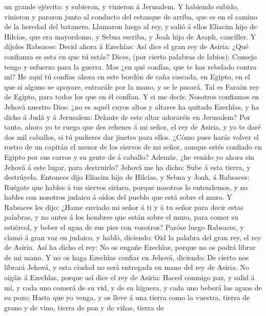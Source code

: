 un grande ejército: y subieron, y vinieron á Jerusalem. Y habiendo
subido, vinieron y pararon junto al conducto del estanque de arriba, que
es en el camino de la heredad del batanero.  Llamaron luego
al rey, y salió á ellos Eliacim hijo de Hilcías, que era mayordomo, y
Sebna escriba, y Joah hijo de Asaph, canciller.  Y díjoles
Rabsaces: Decid ahora á Ezechîas: Así dice el gran rey de Asiria: ¿Qué
confianza es esta en que tú estás?  Dices, (por cierto
palabras de labios): Consejo tengo y esfuerzo para la guerra. Mas ¿en
qué confías, que te has rebelado contra mí?  He aquí tú
confías ahora en este bordón de caña cascada, en Egipto, en el que si
alguno se apoyare, entrarále por la mano, y se le pasará. Tal es Faraón
rey de Egipto, para todos los que en él confían.  Y si me
decís: Nosotros confiamos en Jehová nuestro Dios: ¿no es aquél cuyos
altos y altares ha quitado Ezechîas, y ha dicho á Judá y á Jerusalem:
Delante de este altar adoraréis en Jerusalem?  Por tanto,
ahora yo te ruego que des rehenes á mi señor, el rey de Asiria, y yo te
daré dos mil caballos, si tú pudieres dar jinetes para ellos.
 ¿Cómo pues harás volver el rostro de un capitán el menor
de los siervos de mi señor, aunque estés confiado en Egipto por sus
carros y su gente de á caballo?  Además, ¿he venido yo
ahora sin Jehová á este lugar, para destruirlo? Jehová me ha dicho: Sube
á esta tierra, y destrúyela.  Entonces dijo Eliacim hijo de
Hilcías, y Sebna y Joah, á Rabsaces: Ruégote que hables á tus siervos
siriaco, porque nosotros lo entendemos, y no hables con nosotros judaico
á oídos del pueblo que está sobre el muro.  Y Rabsaces les
dijo: ¿Hame enviado mi señor á ti y á tu señor para decir estas
palabras, y no antes á los hombres que están sobre el muro, para comer
su estiércol, y beber el agua de sus pies con vosotros? 
Paróse luego Rabsaces, y clamó á gran voz en judaico, y habló, diciendo:
Oid la palabra del gran rey, el rey de Asiria.  Así ha
dicho el rey: No os engañe Ezechîas, porque no os podrá librar de mi
mano.  Y no os haga Ezechîas confiar en Jehová, diciendo:
De cierto nos librará Jehová, y esta ciudad no será entregada en mano
del rey de Asiria.  No oigáis á Ezechîas, porque así dice
el rey de Asiria: Haced conmigo paz, y salid á mí, y cada uno comerá de
su vid, y de su higuera, y cada uno beberá las aguas de su pozo;
 Hasta que yo venga, y os lleve á una tierra como la
vuestra, tierra de grano y de vino, tierra de pan y de viñas, tierra de
